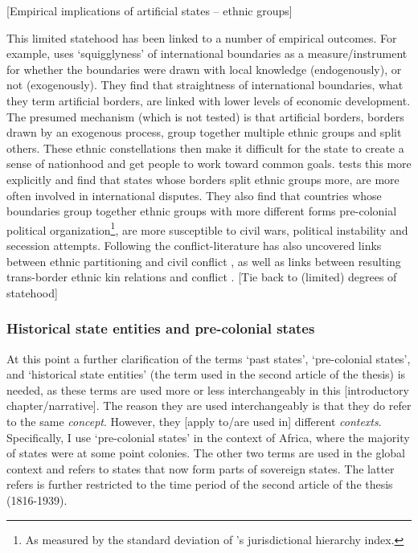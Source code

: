 \documentclass[12pt]{article}
\begin{document}
[Empirical implications of artificial states -- ethnic groups]

This limited statehood has been linked to a number of empirical outcomes. For
example, \citet{Alesina2011} uses `squigglyness' of international boundaries as
a measure/instrument for whether the boundaries were drawn with local knowledge
(endogenously), or not (exogenously). They find that straightness of
international boundaries, what they term artificial borders, are linked with
lower levels of economic development. The presumed mechanism (which is not
tested) is that artificial borders, borders drawn by an exogenous process, group
together multiple ethnic groups and split others. These ethnic constellations
then make it difficult for the state to create a sense of nationhood and get
people to work toward common goals. \citet{Englebert2002} tests this more
explicitly and find that states whose borders split ethnic groups more, are more
often involved in international disputes. They also find that countries whose
boundaries group together ethnic groups with more different forms pre-colonial
political organization\footnote{As measured by the standard deviation of
\citet{Murdock1967}'s jurisdictional hierarchy index.}, are more susceptible to
civil wars, political instability and secession attempts. Following
\citet{Englebert2002} the conflict-literature has also uncovered links between
ethnic partitioning and civil conflict \citep{Ito2020}, as well as links between
resulting trans-border ethnic kin relations and conflict \citep{Cederman2013,
Salehyan2009, Weidmann2015}. [Tie back to (limited) degrees of statehood]

\subsubsection{Historical state entities and pre-colonial states} 
\label{Historical state entities and Pre-colonial states}

At this point a further clarification of the terms `past states',
`pre-colonial states', and `historical state entities' (the term used in the
second article of the thesis) is needed, as these terms are used more or less
interchangeably in this [introductory chapter/narrative]. The reason they are
used interchangeably is that they do refer to the same \textit{concept}.
However, they [apply to/are used in] different \textit{contexts}. Specifically,
I use `pre-colonial states' in the context of Africa, where the majority of
states were at some point colonies. The other two terms are used in the global
context and refers to states that now form parts of sovereign states. The latter
refers is further restricted to the time period of the second article of the
thesis (1816-1939).
\end{document}
